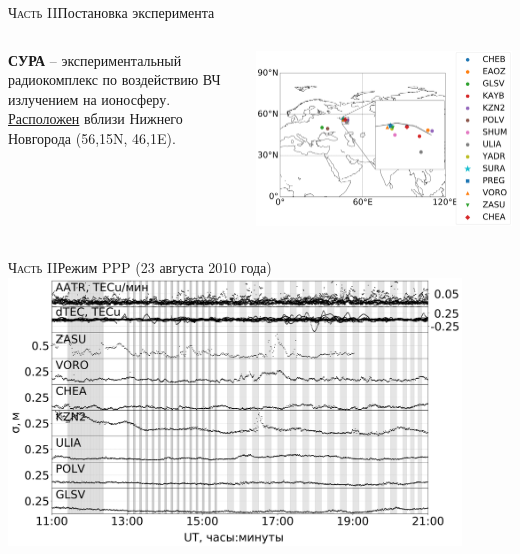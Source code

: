 \begin{frame}{\textsc{Часть II}}{Постановка эксперимента}
\begin{columns}
\begin{column}{0.3\textwidth}
\textbf{СУРА} -- экспериментальный радиокомплекс по воздействию ВЧ излучением на ионосферу. \href{https://clck.ru/NfWnc}{Расположен} вблизи Нижнего Новгорода (56,15\degree N, 46,1\degree E). 
\end{column}
\begin{column}{0.7\textwidth}
\includegraphics[width=\textwidth]{../fig/sites.png}  
\end{column}
\end{columns}
\end{frame}

\begin{frame}{\textsc{Часть II}}{Режим PPP (23 августа 2010 года)}
\centering
\includegraphics[width=0.9\textwidth]{../fig/src/ppp-2010-235.png}
\end{frame}

